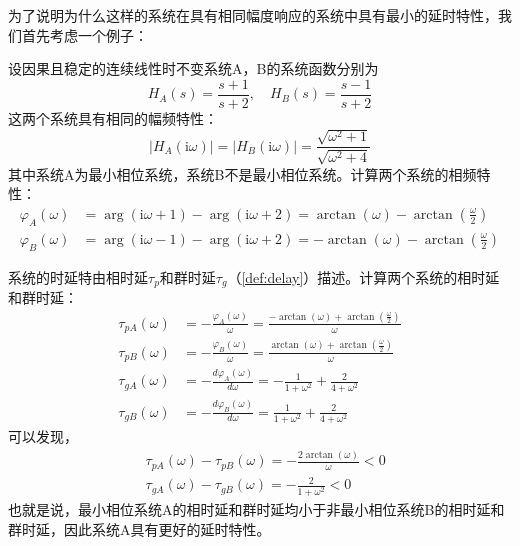 为了说明为什么这样的系统在具有相同幅度响应的系统中具有最小的延时特性，我们首先考虑一个例子：
\begin{example}
    设因果且稳定的连续线性时不变系统A，B的系统函数分别为
    \[H_A(s)=\frac{s+1}{s+2},\quad H_B(s)=\frac{s-1}{s+2}\]
    这两个系统具有相同的幅频特性：
    \[|H_A(\mathrm{i}\omega)|=|H_B(\mathrm{i}\omega)|=\frac{\sqrt{\omega^2+1}}{\sqrt{\omega^2+4}}\]
    其中系统A为最小相位系统，系统B不是最小相位系统。计算两个系统的相频特性：
    \begin{align*}
        \varphi_A(\omega)&=\arg(\mathrm{i}\omega+1)-\arg(\mathrm{i}\omega+2)=\arctan(\omega)-\arctan\left(\frac{\omega}{2}\right)\\
        \varphi_B(\omega)&=\arg(\mathrm{i}\omega-1)-\arg(\mathrm{i}\omega+2)=-\arctan(\omega)-\arctan\left(\frac{\omega}{2}\right)
    \end{align*}

    系统的时延特由相时延$\tau_p$和群时延$\tau_g$（\cref{def:delay}）描述。计算两个系统的相时延和群时延：
    \begin{align*}
        \tau_{pA}(\omega)&=-\frac{\varphi_A(\omega)}{\omega}=\frac{-\arctan(\omega)+\arctan\left(\frac{\omega}{2}\right)}{\omega}\\
        \tau_{pB}(\omega)&=-\frac{\varphi_B(\omega)}{\omega}=\frac{\arctan(\omega)+\arctan\left(\frac{\omega}{2}\right)}{\omega}\\
        \tau_{gA}(\omega)&=-\frac{d\varphi_A(\omega)}{d\omega}=-\frac{1}{1+\omega^2}+\frac{2}{4+\omega^2}\\
        \tau_{gB}(\omega)&=-\frac{d\varphi_B(\omega)}{d\omega}=\frac{1}{1+\omega^2}+\frac{2}{4+\omega^2}
    \end{align*}
    可以发现，
    \begin{align*}
        &\tau_{pA}(\omega)-\tau_{pB}(\omega)=-\frac{2\arctan(\omega)}{\omega}<0\\
        &\tau_{gA}(\omega)-\tau_{gB}(\omega)=-\frac{2}{1+\omega^2}<0
    \end{align*}
    也就是说，最小相位系统A的相时延和群时延均小于非最小相位系统B的相时延和群时延，因此系统A具有更好的延时特性。
\end{example}

